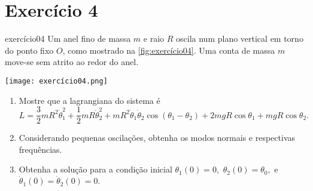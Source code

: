 \section*{Exercício 4}
\begin{exercício}{}{exercício04}
    Um anel fino de massa \(m\) e raio \(R\) oscila num plano vertical em torno do ponto fixo \(O\), como mostrado na \cref{fig:exercício04}. Uma conta de massa \(m\) move-se sem atrito ao redor do anel.
    \begin{center}
        \texttt{[image: exercício04.png]}
        \label{fig:exercício04}
    \end{center}
    \begin{enumerate}[label=(\alph*)]
        \item Mostre que a lagrangiana do sistema é
            \begin{equation*}
                L = \frac32 mR^2\dot\theta_1^2 + \frac12 mR\dot\theta_2^2 + m R^2\dot\theta_1\dot\theta_2\cos{(\theta_1 - \theta_2)} + 2mgR \cos\theta_1 + mgR\cos\theta_2.
            \end{equation*}
        \item Considerando pequenas oscilações, obtenha os modos normais e respectivas frequências.
        \item Obtenha a solução para a condição inicial \(\theta_1(0) = 0,\) \(\theta_2(0) = \theta_0,\) e \(\dot\theta_1(0) = \dot\theta_2(0) = 0.\)
    \end{enumerate}
\end{exercício}
